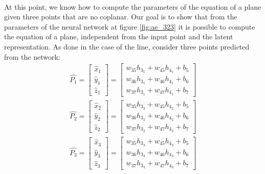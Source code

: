 \paragraph{}
At this point, we know how to compute the parameters of the equation of a plane given three points that are no coplanar. Our goal is to show that from the parameters of the neural network at figure \ref{fig:ae_323} it is possible to compute the equation of a plane, independent from the input point and the latent representation. \newline
As done in the case of the line, consider three points predicted from the network:
\begin{equation}
    \label{eq:ae_323_points}
    \begin{gathered}
        \hat{P_1} = \begin{bmatrix}
            \hat{x}_1 \\
            \hat{y}_1 \\
            \hat{z}_1
        \end{bmatrix}
        = \begin{bmatrix}
            w_{35}h_{3_1} + w_{45}h_{4_1} + b_{5} \\
            w_{36}h_{3_1} + w_{46}h_{4_1} + b_{6} \\
            w_{37}h_{3_1} + w_{47}h_{4_1} + b_{7} 
        \end{bmatrix} \\
        \hat{P_2} = \begin{bmatrix}
            \hat{x}_2 \\
            \hat{y}_2 \\
            \hat{z}_2
        \end{bmatrix}
        = \begin{bmatrix}
            w_{35}h_{3_2} + w_{45}h_{4_2} + b_{5} \\
            w_{36}h_{3_2} + w_{46}h_{4_2} + b_{6} \\
            w_{37}h_{3_2} + w_{47}h_{4_2} + b_{7} 
        \end{bmatrix} \\
        \hat{P_3} = \begin{bmatrix}
            \hat{x}_3 \\
            \hat{y}_3 \\
            \hat{z}_3
        \end{bmatrix}
        = \begin{bmatrix}
            w_{35}h_{3_3} + w_{45}h_{4_3} + b_{5} \\
            w_{36}h_{3_3} + w_{46}h_{4_3} + b_{6} \\
            w_{37}h_{3_3} + w_{47}h_{4_3} + b_{7} 
        \end{bmatrix}
    \end{gathered}
\end{equation}
